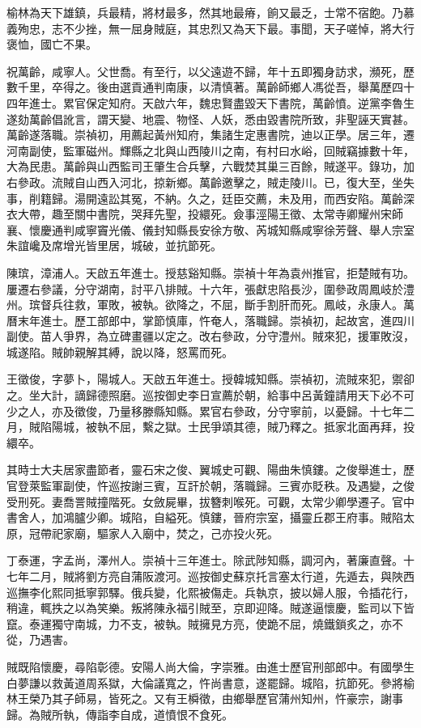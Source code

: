 \begin{pinyinscope}
榆林為天下雄鎮，兵最精，將材最多，然其地最瘠，餉又最乏，士常不宿飽。乃慕義殉忠，志不少挫，無一屈身賊庭，其忠烈又為天下最。事聞，天子嗟悼，將大行褒恤，國亡不果。

祝萬齡，咸寧人。父世喬。有至行，以父遠遊不歸，年十五即獨身訪求，瀕死，歷數千里，卒得之。後由選貢通判南康，以清慎著。萬齡師鄉人馮從吾，舉萬歷四十四年進士。累官保定知府。天啟六年，魏忠賢盡毀天下書院，萬齡憤。逆黨李魯生遂劾萬齡倡訛言，謂天變、地震、物怪、人妖，悉由毀書院所致，非聖誣天實甚。萬齡遂落職。崇禎初，用薦起黃州知府，集諸生定惠書院，迪以正學。居三年，遷河南副使，監軍磁州。輝縣之北與山西陵川之南，有村曰水峪，回賊竊據數十年，大為民患。萬齡與山西監司王肇生合兵擊，六戰焚其巢三百餘，賊遂平。錄功，加右參政。流賊自山西入河北，掠新鄉。萬齡邀擊之，賊走陵川。已，復大至，坐失事，削籍歸。湯開遠訟其冤，不納。久之，廷臣交薦，未及用，而西安陷。萬齡深衣大帶，趣至關中書院，哭拜先聖，投繯死。僉事涇陽王徵、太常寺卿耀州宋師襄、懷慶通判咸寧竇光儀、儀封知縣長安徐方敬、芮城知縣咸寧徐芳聲、舉人宗室朱誼巉及席增光皆里居，城破，並抗節死。

陳瑸，漳浦人。天啟五年進士。授慈谿知縣。崇禎十年為袁州推官，拒楚賊有功。屢遷右參議，分守湖南，討平八排賊。十六年，張獻忠陷長沙，圍參政周鳳岐於澧州。瑸督兵往救，軍敗，被執。欲降之，不屈，斷手割肝而死。鳳岐，永康人。萬曆末年進士。歷工部郎中，掌節慎庫，忤奄人，落職歸。崇禎初，起故宮，進四川副使。苗人爭界，為立碑畫疆以定之。改右參政，分守澧州。賊來犯，援軍敗沒，城遂陷。賊帥親解其縛，說以降，怒罵而死。

王徵俊，字夢卜，陽城人。天啟五年進士。授韓城知縣。崇禎初，流賊來犯，禦卻之。坐大計，謫歸德照磨。巡按御史李日宣薦於朝，給事中呂黃鐘請用天下必不可少之人，亦及徵俊，乃量移滕縣知縣。累官右參政，分守寧前，以憂歸。十七年二月，賊陷陽城，被執不屈，繫之獄。士民爭頌其德，賊乃釋之。抵家北面再拜，投繯卒。

其時士大夫居家盡節者，靈石宋之俊、翼城史可觀、陽曲朱慎鏤。之俊舉進士，歷官登萊監軍副使，忤巡按謝三賓，互訐於朝，落職歸。三賓亦貶秩。及遇變，之俊受刑死。妻喬詈賊撞階死。女斂屍畢，拔簪刺喉死。可觀，太常少卿學遷子。官中書舍人，加鴻臚少卿。城陷，自縊死。慎鏤，晉府宗室，攝靈丘郡王府事。賊陷太原，冠帶祀家廟，驅家人入廟中，焚之，己亦投火死。

丁泰運，字孟尚，澤州人。崇禎十三年進士。除武陟知縣，調河內，著廉直聲。十七年二月，賊將劉方亮自蒲阪渡河。巡按御史蘇京托言塞太行道，先遁去，與陜西巡撫李化熙同抵寧郭驛。俄兵變，化熙被傷走。兵執京，披以婦人服，令插花行，稍違，輒抶之以為笑樂。叛將陳永福引賊至，京即迎降。賊遂逼懷慶，監司以下皆竄。泰運獨守南城，力不支，被執。賊擁見方亮，使跪不屈，燒鐵鎖炙之，亦不從，乃遇害。

賊既陷懷慶，尋陷彰德。安陽人尚大倫，字崇雅。由進士歷官刑部郎中。有國學生白夢謙以救黃道周系獄，大倫議寬之，忤尚書意，遂罷歸。城陷，抗節死。參將榆林王榮乃其子師易，皆死之。又有王橓徵，由鄉舉歷官蒲州知州，忤豪宗，謝事歸。為賊所執，傳詣李自成，道憤恨不食死。


\end{pinyinscope}